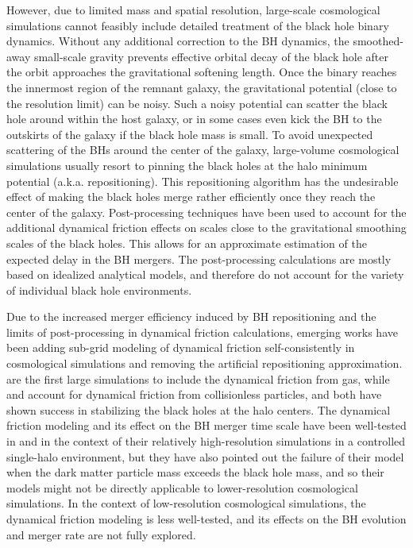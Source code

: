However, due to limited mass and spatial resolution, large-scale cosmological simulations cannot feasibly include detailed treatment of the black hole binary dynamics. Without any additional correction to the BH dynamics, the smoothed-away small-scale gravity prevents effective orbital decay of the black hole after the orbit approaches the gravitational softening length. Once the binary reaches the innermost region of the remnant galaxy, the gravitational potential (close to the resolution limit) can be noisy. Such a noisy potential can scatter the black hole around within the host galaxy, or in some cases even kick the BH to the outskirts of the galaxy if the black hole mass is small. To avoid unexpected scattering of the BHs around the center of the galaxy, large-volume cosmological simulations usually resort to pinning the black holes at the halo minimum potential (a.k.a. repositioning). This repositioning algorithm has the undesirable effect of making the black holes merge rather efficiently
once they reach the center of the galaxy. Post-processing techniques have been used \citep[e.g.][]{Salcido2016,Kelley2017,Katz2020,Volonteri2020} to account for the additional dynamical friction effects on scales close to the gravitational smoothing scales of the black holes. This allows for an approximate estimation of the expected delay in the BH mergers. The post-processing calculations are mostly based on idealized analytical models, and therefore do not account for the variety of individual black hole environments.

Due to the increased merger efficiency induced by BH repositioning and the limits of post-processing in dynamical friction  calculations, emerging works have been adding sub-grid modeling of dynamical friction  self-consistently in cosmological simulations and removing the artificial repositioning approximation.
\cite{Chapon2013,Dubois2014} are the first large simulations to include the dynamical friction from gas, while \cite{Hirschmann2014} and \cite{Tremmel2017} account for dynamical friction from collisionless particles, and both have shown success in stabilizing the black holes at the halo centers. The dynamical friction modeling and its effect on the BH merger time scale have been well-tested in \cite{Tremmel2015} and \cite{Pfister2019} in the context of their relatively high-resolution simulations in a controlled single-halo environment, but they have also pointed out the failure of their model when the dark matter particle mass exceeds the black hole mass, and so their models might not be directly applicable to lower-resolution cosmological simulations. In the context of low-resolution cosmological simulations, the dynamical friction modeling is less well-tested, and its effects on the BH evolution and merger rate are not fully explored.

